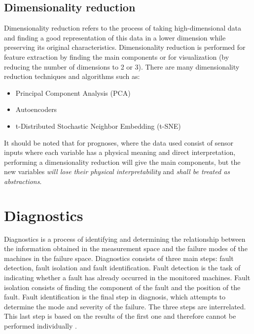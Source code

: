 \subsection{Dimensionality reduction}
\label{section:dimensionality-reduction}
Dimensionality reduction refers to the process of taking high-dimensional data and finding a good representation of this data in a lower dimension while preserving its original characteristics. Dimensionality reduction is performed for feature extraction by finding the main components or for visualization (by reducing the number of dimensions to 2 or 3).
There are many dimensionality reduction techniques and algorithms such as:
\begin{itemize}
    \item Principal Component Analysis (PCA)
    \item Autoencoders
    \item t-Distributed Stochastic Neighbor Embedding (t-SNE)
\end{itemize}

It should be noted that for prognoses, where the data used consist of sensor inputs where each variable has a physical meaning and direct interpretation, performing a dimensionality reduction will give the main components, but the new variables \textit{will lose their physical interpretability} and \textit{shall be treated as abstractions}.


\section{Diagnostics}
Diagnostics is a process of identifying and determining the relationship between the information obtained in the measurement space and the failure modes of the machines in the failure space. Diagnostics consists of three main steps: fault detection, fault isolation and fault identification. Fault detection is the task of indicating whether a fault has already occurred in the monitored machines. Fault isolation consists of finding the component of the fault and the position of the fault. Fault identification is the final step in diagnosis, which attempts to determine the mode and severity of the failure. The three steps are interrelated. This last step is based on the results of the first one and therefore cannot be performed individually \cite{Lei2016b}.

